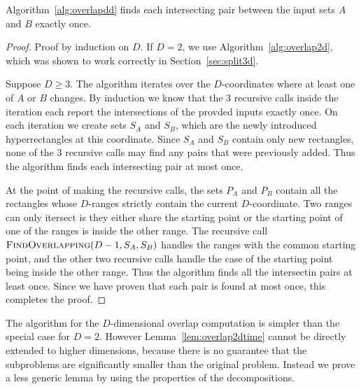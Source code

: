\documentclass[english,gradu]{tktltiki2018}
\begin{document}
\begin{lem}\label{lem:overlapddok}
Algorithm~\ref{alg:overlapdd} finds each intersecting pair between the input sets $A$ and $B$ exactly once.
\end{lem}
\begin{proof}
Proof by induction on $D$.
If $D=2$, we use Algorithm~\ref{alg:overlap2d}, which was shown to work correctly in Section~\ref{sec:split3d}.

Suppose $D\ge 3$.
The algorithm iterates over the $D$-coordinates where at least one of $A$ or $B$ changes.
By induction we know that the 3 recursive calls inside the iteration each report the intersections of the provded inputs exactly once.
On each iteration we create sets $S_A$ and $S_B$, which are the newly introduced hyperrectangles at this coordinate.
Since $S_A$ and $S_B$ contain only new rectangles, none of the 3 recursive calls may find any pairs that were previously added.
Thus the algorithm finds each intersecting pair at most once.

At the point of making the recursive calls, the sets $P_A$ and $P_B$ contain all the rectangles whose $D$-ranges strictly contain the current $D$-coordinate.
Two ranges can only itersect is they either share the starting point or the starting point of one of the ranges is inside the other range.
The recursive call $\textsc{FindOverlapping}(D-1,S_A,S_B)$ handles the ranges with the common starting point, and the other two recursive calls handle the case of the starting point being inside the other range.
Thus the algorithm finds all the intersectin pairs at least once.
Since we have proven that each pair is found at most once, this completes the proof.
\end{proof}

The algorithm for the $D$-dimensional overlap computation is simpler than the special case for $D=2$.
However Lemma~\ref{lem:overlap2dtime} cannot be directly extended to higher dimensions, because there is no guarantee that the subproblems are significantly smaller than the original problem.
Instead we prove a less generic lemma by using the properties of the decompositions.
\end{document}
